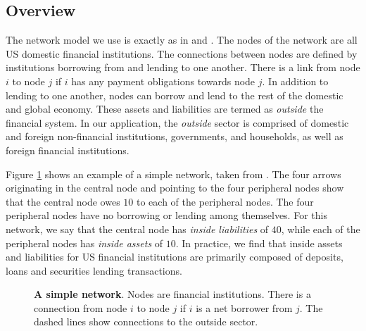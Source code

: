 

\subsection{Overview}
 The network model we use is exactly as in \citet{eisenberg2001systemic} and \citet{glasserman2015likely}. The nodes of the network are all US domestic financial institutions. The connections between nodes are defined by institutions borrowing from and lending to one another. There is a link from node $i$ to node $j$ if $i$ has any payment obligations towards node $j$. In addition to lending to one another, nodes can borrow and lend to the rest of the domestic and global economy. These assets and liabilities are termed as \textit{outside} the financial system. In our application, the \textit{outside} sector is comprised of domestic and foreign non-financial institutions, governments, and households, as well as foreign financial institutions.

Figure \ref{fig:networkExample} shows an example of a simple network, taken from \citet{glasserman2015likely}. The four arrows originating in the central node and pointing to the four peripheral nodes show that the central node owes $10$ to each of the peripheral nodes. The four peripheral nodes have no borrowing or lending among themselves. For this network, we say that the central node has \textit{inside liabilities }of $40$, while each of the peripheral nodes has \textit{inside assets} of $10$. In practice, we find that inside assets and liabilities for US financial institutions are primarily composed of deposits, loans and securities lending transactions.


\begin{figure}
\par
\begin{center}

\end{center}
\caption{\textbf{A simple network}. Nodes are financial institutions. There is a connection from node $i$ to node $j$ if $i$ is a net borrower from $j$. The dashed lines show connections to the outside sector.}
\label{fig:networkExample}\vspace{.3in}
\end{figure}


